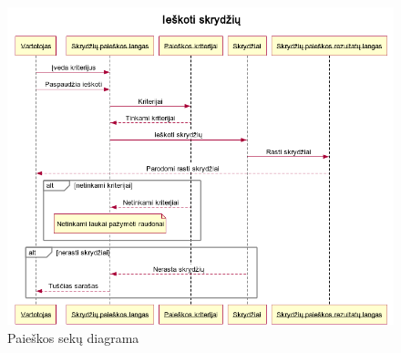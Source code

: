 \documentclass{VUMIFPSkursinis}
\begin{document}
\begin{enumerate}[label=\textbf{U\arabic*}.]
                    \begin{figure}[H]
                        \centering
                        \includegraphics[scale=0.8]{img/seqSearch}
                        \caption{Paieškos sekų diagrama}
                        \label{home_page_one_way}
                    \end{figure}


\end{enumerate}
\end{document}
